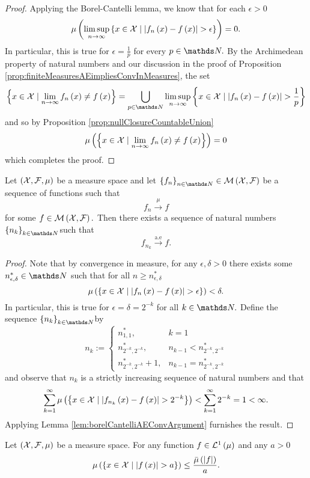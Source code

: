 \begin{proof}
Applying the Borel-Cantelli lemma, we know that for each $\epsilon>0$
\[
\mu\left(\limsup_{n\to\infty}\left\{ x\in\mathcal{X}\mid\lvert f_{n}\left(x\right)-f\left(x\right)\rvert>\epsilon\right\} \right)=0.
\]
In particular, this is true for $\epsilon=\frac{1}{p}$ for every
$p\in\N.$ By the Archimedean property of natural numbers and our
discussion in the proof of Proposition \ref{prop:finiteMeasuresAEimpliesConvInMeasures},
the set
\[
\left\{ x\in\X\mid\lim_{n\to\infty}f_{n}\left(x\right)\neq f\left(x\right)\right\} =\bigcup_{p\in\N}\limsup_{n\to\infty}\left\{ x\in\X\mid\lvert f_{n}\left(x\right)-f\left(x\right)\rvert>\frac{1}{p}\right\} 
\]
and so by Proposition \ref{prop:nullClosureCountableUnion}
\[
\mu\left(\left\{ x\in\mathcal{X}\mid\lim_{n\to\infty}f_{n}\left(x\right)\neq f\left(x\right)\right\} \right)=0
\]
which completes the proof.
\end{proof}
\begin{prop}
\label{prop:convInMeasureImpliesSubsequenceAE}Let $\left(\mathcal{X},\mathcal{F},\mu\right)$
be a measure space and let $\left\{ f_{n}\right\} _{n\in\N}\in\measurableFunctions$
be a sequence of functions such that 
\[
f_{n}\stackrel{\mu}{\longrightarrow}f
\]
for some $f\in\mathcal{M}\left(\mathcal{X},\mathcal{F}\right).$ Then there exists a sequence
of natural numbers $\left\{ n_{k}\right\} _{k\in\N}$such that
\[
f_{n_{k}}\stackrel{\text{a.e}}{\longrightarrow}f.
\]
\end{prop}

\begin{proof}
Note that by convergence in measure, for any $\epsilon,\delta>0$
there exists some $n_{\epsilon,\delta}^{*}\in\N$ such that for all
$n\geq n_{\epsilon,\delta}^{*}$
\[
\mu\left(\left\{ x\in\mathcal{X}\mid\lvert f_{n}\left(x\right)-f\left(x\right)\rvert>\epsilon\right\} \right)<\delta.
\]
In particular, this is true for $\epsilon=\delta=2^{-k}$ for all
$k\in\N.$ Define the sequence $\left\{ n_{k}\right\} _{k\in\N}$by
\[
n_{k}:=\begin{cases}
n_{1,1}^{*}, & k=1\\
n_{2^{-k},2^{-k}}^{*}, & n_{k-1}<n_{2^{-k},2^{-k}}^{*}\\
n_{2^{-k},2^{-k}}^{*}+1, & n_{k-1}=n_{2^{-k},2^{-k}}^{*}
\end{cases}
\]
and observe that $n_{k}$ is a strictly increasing sequence of natural
numbers and that 
\[
\sum_{k=1}^{\infty}\mu\left(\left\{ x\in\mathcal{X}\mid\lvert f_{n_{k}}\left(x\right)-f\left(x\right)\rvert>2^{-k}\right\} \right)<\sum_{k=1}^{\infty}2^{-k}=1<\infty.
\]
Applying Lemma \ref{lem:borelCantelliAEConvArgument} furnishes the
result.
\end{proof}
\begin{prop}
\label{prop:markovInequality} Let $\left(\mathcal{X},\mathcal{F},\mu\right)$ be a
measure space. For any function $f\in\mathcal{L}^{1}\left(\mu\right)$ and any $a>0$
\[
\mu\left(\left\{ x\in\mathcal{X}\mid\lvert f\left(x\right)\rvert>a\right\} \right)\leq\frac{\bar{\mu}\left(\lvert f\rvert\right)}{a}.
\]
\end{prop}

